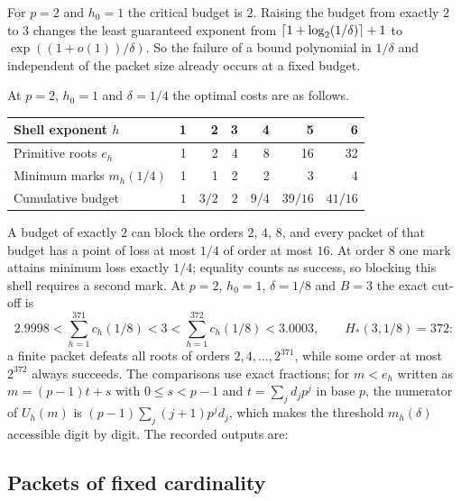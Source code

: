 For $p=2$ and $h_0=1$ the critical budget is $2$. Raising the budget from exactly $2$ to
$3$ changes the least guaranteed exponent from $\lceil1+\log_2(1/\delta)\rceil+1$ to
$\exp((1+o(1))/\delta)$. So the failure of a bound polynomial in $1/\delta$ and independent
of the packet size already occurs at a fixed budget.

\begin{example}\label{cost:ex:packet}
At $p=2$, $h_0=1$ and $\delta=1/4$ the optimal costs are as follows.
\begin{center}\begin{tabular}{@{}lrrrrrr@{}}\toprule
Shell exponent $h$ & 1 & 2 & 3 & 4 & 5 & 6\\
\midrule
Primitive roots $e_h$ & 1&2&4&8&16&32\\
Minimum marks $m_h(1/4)$ &1&1&2&2&3&4\\
Cumulative budget & $1$ & $3/2$ & $2$ & $9/4$ & $39/16$ & $41/16$\\
\bottomrule\end{tabular}\end{center}
A budget of exactly $2$ can block the orders $2$, $4$, $8$, and every packet of that budget
has a point of loss at most $1/4$ of order at most $16$. At order $8$ one mark attains
minimum loss exactly $1/4$; equality counts as success, so blocking this shell requires a
second mark. At $p=2$, $h_0=1$, $\delta=1/8$ and $B=3$ the exact cut-off is
\[
 2.9998<\sum_{h=1}^{371}c_h(1/8)<3<\sum_{h=1}^{372}c_h(1/8)<3.0003,\qquad H_*(3,1/8)=372:
\]
a finite packet defeats all roots of orders $2,4,\ldots,2^{371}$, while some order at most
$2^{372}$ always succeeds. The comparisons use exact fractions; for $m<e_h$ written as
$m=(p-1)t+s$ with $0\le s<p-1$ and $t=\sum_jd_jp^j$ in base $p$, the numerator of $U_h(m)$
is $(p-1)\sum_j(j+1)p^jd_j$, which makes the threshold $m_h(\delta)$ accessible digit by
digit. The recorded outputs are:
\end{example}

\subsection{Packets of fixed cardinality}\label{cost:sec:cardinality}
{\raggedright{}}

